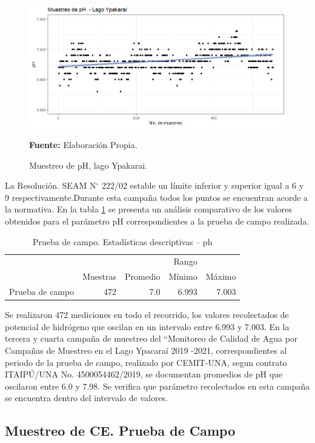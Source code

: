\begin{figure}[H]
        \centering
        \includegraphics[width=0.75\linewidth]{Imagenes/cap4/pHLago.png}
        \caption {Muestreo de pH, lago Ypakarai. }{\textbf{Fuente:}
        Elaboraci\'on Propia. }
        \label{fig:Lago_ph}
\end{figure}

La Resoluci\'on. SEAM N$ ^{\circ}$ 222/02 estable un l\'imite inferior y superior igual a 6 y 9 respectivamente.Durante esta campa\~na todos los puntos se encuentran acorde a la normativa.
En la tabla \ref{table:Lago_ph} se presenta un an\'alisis comparativo de los valores obtenidos para el par\'ametro pH correspondientes a la prueba de campo  realizada.

\begin{table}[H]
\centering
\caption{Prueba de campo. Estadísticas descriptivas – ph}
\label{table:Lago_ph}
\begin{tabular}{lrrrr}
\toprule & 
\multicolumn{3}{r}{Rango} \\ \cline{4-5} & 
Muestras & Promedio & Mínimo & Máximo \\
\midrule
Prueba de campo  &      472 &      7.0 &  6.993 &  7.003 \\
\bottomrule
\end{tabular}
\end{table}
Se realizaron 472 mediciones en todo el recorrido, los valores recolectados de potencial de hidr\'ogeno que oscilan en un intervalo entre 6.993 y 7.003.
En la tercera \cite{3er_Cemit} y cuarta \cite{4to_Cemit} campaña de muestreo del “Monitoreo de Calidad de Agua por Campañas de Muestreo en el Lago Ypacaraí 2019 -2021, correspondientes al periodo de la prueba de campo, realizado por CEMIT-UNA, segun contrato ITAIPÚ/UNA No. 4500054462/2019, se documentan promedios de pH que oscilaron entre 6.0 y 7.98. 
Se verifica que par\'ametro recolectados en esta campa\~na se encuentra dentro del intervalo de valores.

\subsection{Muestreo de CE. Prueba de Campo}

